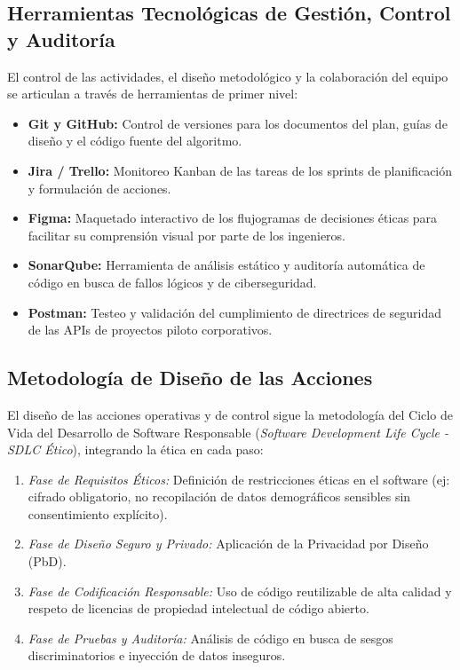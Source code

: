 \documentclass[12pt,a4paper]{article}
\begin{document}
\subsection{Herramientas Tecnológicas de Gestión, Control y Auditoría}
El control de las actividades, el diseño metodológico y la colaboración del equipo se articulan a través de herramientas de primer nivel:
\begin{itemize}
    \item \textbf{Git y GitHub:} Control de versiones para los documentos del plan, guías de diseño y el código fuente del algoritmo.
    \item \textbf{Jira / Trello:} Monitoreo Kanban de las tareas de los sprints de planificación y formulación de acciones.
    \item \textbf{Figma:} Maquetado interactivo de los flujogramas de decisiones éticas para facilitar su comprensión visual por parte de los ingenieros.
    \item \textbf{SonarQube:} Herramienta de análisis estático y auditoría automática de código en busca de fallos lógicos y de ciberseguridad.
    \item \textbf{Postman:} Testeo y validación del cumplimiento de directrices de seguridad de las APIs de proyectos piloto corporativos.
\end{itemize}

\subsection{Metodología de Diseño de las Acciones}
El diseño de las acciones operativas y de control sigue la metodología del Ciclo de Vida del Desarrollo de Software Responsable (\textit{Software Development Life Cycle - SDLC Ético}), integrando la ética en cada paso:
\begin{enumerate}
    \item \textit{Fase de Requisitos Éticos:} Definición de restricciones éticas en el software (ej: cifrado obligatorio, no recopilación de datos demográficos sensibles sin consentimiento explícito).
    \item \textit{Fase de Diseño Seguro y Privado:} Aplicación de la Privacidad por Diseño (PbD).
    \item \textit{Fase de Codificación Responsable:} Uso de código reutilizable de alta calidad y respeto de licencias de propiedad intelectual de código abierto.
    \item \textit{Fase de Pruebas y Auditoría:} Análisis de código en busca de sesgos discriminatorios e inyección de datos inseguros.
\end{enumerate}
\end{document}
